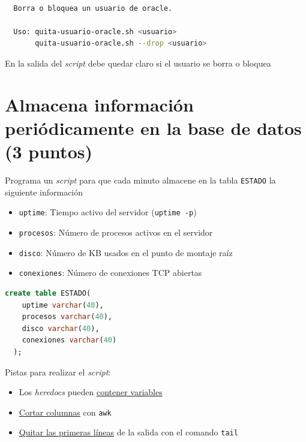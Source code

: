 \documentclass[a4paper]{article}
\begin{document}
\begin{lstlisting}[language=bash,label=lst:quita-usuario-ayuda,caption={Ayuda del script \texttt{quita-usuario-oracle.sh}},captionpos=b,numbers=none]

  Borra o bloquea un usuario de oracle.
  
  Uso: quita-usuario-oracle.sh <usuario>
       quita-usuario-oracle.sh --drop <usuario>
\end{lstlisting}

\begin{Aviso}
En la salida del \emph{script} debe quedar claro si el usuario se borra o bloquea
\end{Aviso}



\section{Almacena información periódicamente en la base de datos (3 puntos)}
\label{sec:org000000c}
Programa un \emph{script} para que cada minuto almacene en la tabla \texttt{ESTADO} la siguiente información

\begin{itemize}
\item \texttt{uptime}: Tiempo activo del servidor (\texttt{uptime -p})
\item \texttt{procesos}: Número de procesos activos en el servidor
\item \texttt{disco}: Número de KB usados en el punto de montaje raíz
\item \texttt{conexiones}: Número de conexiones TCP abiertas
\end{itemize}


\begin{lstlisting}[language=SQL,label=lst:tabla.sql,caption={Creación de la tabla \texttt{ESTADO}},captionpos=b,numbers=none]
  create table ESTADO(
    uptime varchar(40),
    procesos varchar(40),
    disco varchar(40),
    conexiones varchar(40)
  );
\end{lstlisting}


\begin{Aviso}
Pistas para realizar el \emph{script}:
\begin{itemize}
\item Los \emph{heredocs} pueden \href{http://superuser.com/questions/456615/how-to-pass-variables-to-a-heredoc-in-bash}{contener variables}
\item \href{https://www.cyberciti.biz/tips/processing-the-delimited-files-using-cut-and-awk.html}{Cortar columnas} con \texttt{awk}
\item \href{https://linuxconfig.org/commands-on-how-to-delete-a-first-line-from-a-text-file-using-bash-shell}{Quitar las primeras líneas} de la salida con el comando \texttt{tail}
\end{itemize}
\end{Aviso}
\end{document}
